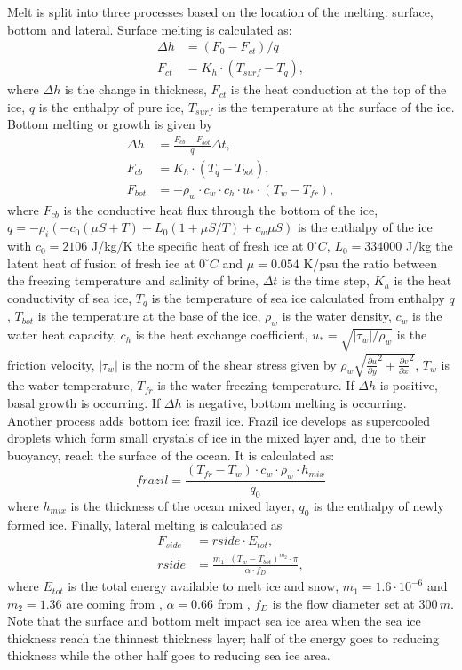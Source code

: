 Melt is split into three processes based on the location of the melting: surface, bottom and lateral. Surface melting is calculated as:
\begin{align}
\Delta h &= (F_{0} - F_{ct})/q\\
F_{ct} &= K_h \cdot (T_{surf} - T_q),
\end{align}
where $\Delta h$ is the change in thickness, $F_{ct}$ is the heat conduction at the top of the ice, $q$ is the enthalpy of pure ice, $T_{surf}$ is the temperature at the surface of the ice. Bottom melting or growth is given by 
\begin{align}
\Delta h &= \frac{F_{cb} - F_{bot}}{q} \Delta t, \label{eq1}\\ 
F_{cb} &= K_h \cdot (T_q - T_{bot}), \label{eq2}\\
F_{bot} &= - \rho_w \cdot c_w \cdot c_h \cdot u_* \cdot (T_w - T_{fr}),\label{eq3}
\end{align}
where $F_{cb}$ is the conductive heat flux through the bottom of the ice, $q = -\rho_i(-c_0(\mu S+T)+L_0(1+\mu S/T)+c_w \mu S)$ is the enthalpy of the ice with $c_0=2106$ J/kg/K the specific heat of fresh ice at $0^\circ C$, $L_0 = 334 000$ J/kg the latent heat of fusion of fresh ice at $0^\circ C$ and $\mu=0.054$ K/psu the ratio between the freezing temperature and salinity of brine, $\Delta t$ is the time step, $K_h$ is the heat conductivity of sea ice, $T_q$ is the temperature of sea ice calculated from enthalpy $q$, $T_{bot}$ is the temperature at the base of the ice, $\rho_w$ is the water density, $c_w$ is the water heat capacity, $c_h$ is the heat exchange coefficient, $u_* = \sqrt{|\tau_w|/\rho_w}$ is the friction velocity, $|\tau_w|$ is the norm of the shear stress given by $\rho_w \sqrt{\frac{\partial u}{\partial y}^2+\frac{\partial v}{\partial x}^2}$, $T_w$ is the water temperature, $T_{fr}$ is the water freezing temperature. If $\Delta h$ is positive, basal growth is occurring. If $\Delta h$ is negative, bottom melting is occurring. Another process adds bottom ice: frazil ice. Frazil ice develops as supercooled droplets which form small crystals of ice in the mixed layer and, due to their buoyancy, reach the surface of the ocean. It is calculated as:
\begin{equation}\label{eqfraz}
frazil = \frac{(T_{fr} - T_w)\cdot c_w \cdot \rho_w \cdot h_{mix}}{q_0} 
\end{equation}
where $h_{mix}$ is the thickness of the ocean mixed layer, $q_0$ is the enthalpy of newly formed ice. Finally, lateral melting is calculated as 
\begin{align}
F_{side} &= rside \cdot E_{tot}, \label{eqml1}\\
rside &= \frac{m_1 \cdot (T_w - T_{bot})^{m_2} \cdot \pi}{\alpha \cdot f_D},\label{eqml2}
\end{align}
where $E_{tot}$ is the total energy available to melt ice and snow, $m_1 = 1.6\cdot 10^{-6}$ and $m_2 = 1.36$ are coming from \cite{MaykutPero1987}, $\alpha = 0.66$ from \cite{Steele1992}, $f_D$ is the flow diameter set at $300 \, m$. Note that the surface and bottom melt impact sea ice area when the sea ice thickness reach the thinnest thickness layer; half of the energy goes to reducing thickness while the other half goes to reducing sea ice area.

